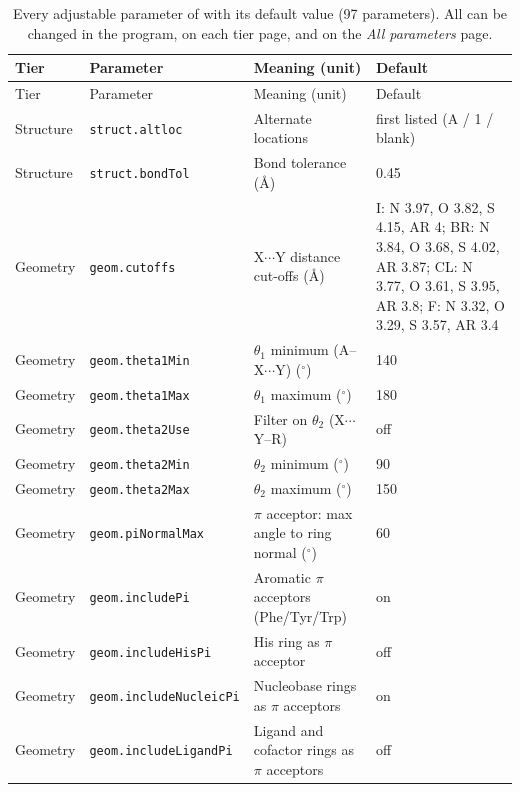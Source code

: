 {\scriptsize
\setlength{\tabcolsep}{3pt}
\begin{longtable}{llp{4.2cm}l}
\caption{Every adjustable parameter of \BX{} with its default value (97 parameters). All can be changed in the program, on each tier page, and on the \emph{All parameters} page.}\label{tab:params}\\
\toprule
Tier & Parameter & Meaning (unit) & Default\\
\midrule
\endfirsthead
\toprule
Tier & Parameter & Meaning (unit) & Default\\
\midrule
\endhead
\bottomrule
\endlastfoot
Structure & \texttt{struct.altloc} & Alternate locations & \parbox[t]{5.0cm}{\raggedright first listed (A / 1 / blank)}\\
Structure & \texttt{struct.bondTol} & Bond tolerance (\AA{}) & \parbox[t]{5.0cm}{\raggedright 0.45}\\
Geometry & \texttt{geom.cutoffs} & X$\cdots$Y distance cut-offs (\AA{}) & \parbox[t]{5.0cm}{\raggedright I: N 3.97, O 3.82, S 4.15, AR 4; BR: N 3.84, O 3.68, S 4.02, AR 3.87; CL: N 3.77, O 3.61, S 3.95, AR 3.8; F: N 3.32, O 3.29, S 3.57, AR 3.4}\\
Geometry & \texttt{geom.theta1Min} & $\theta_1$ minimum (A--X$\cdots$Y) ($^\circ$) & \parbox[t]{5.0cm}{\raggedright 140}\\
Geometry & \texttt{geom.theta1Max} & $\theta_1$ maximum ($^\circ$) & \parbox[t]{5.0cm}{\raggedright 180}\\
Geometry & \texttt{geom.theta2Use} & Filter on $\theta_2$ (X$\cdots$Y--R) & \parbox[t]{5.0cm}{\raggedright off}\\
Geometry & \texttt{geom.theta2Min} & $\theta_2$ minimum ($^\circ$) & \parbox[t]{5.0cm}{\raggedright 90}\\
Geometry & \texttt{geom.theta2Max} & $\theta_2$ maximum ($^\circ$) & \parbox[t]{5.0cm}{\raggedright 150}\\
Geometry & \texttt{geom.piNormalMax} & $\pi$ acceptor: max angle to ring normal ($^\circ$) & \parbox[t]{5.0cm}{\raggedright 60}\\
Geometry & \texttt{geom.includePi} & Aromatic $\pi$ acceptors (Phe/Tyr/Trp) & \parbox[t]{5.0cm}{\raggedright on}\\
Geometry & \texttt{geom.includeHisPi} & His ring as $\pi$ acceptor & \parbox[t]{5.0cm}{\raggedright off}\\
Geometry & \texttt{geom.includeNucleicPi} & Nucleobase rings as $\pi$ acceptors & \parbox[t]{5.0cm}{\raggedright on}\\
Geometry & \texttt{geom.includeLigandPi} & Ligand and cofactor rings as $\pi$ acceptors & \parbox[t]{5.0cm}{\raggedright off}\\

\end{longtable}}
